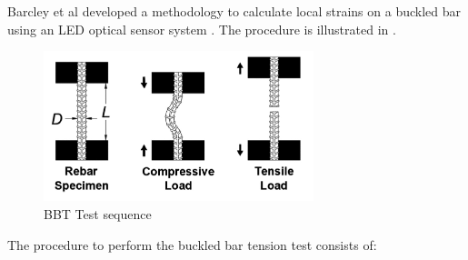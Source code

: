 Barcley et al \cite{Barcley2019} developed a methodology to calculate local strains on a buckled bar using an LED optical sensor system \cite{NorthernDigitalInc.2020}. The procedure is illustrated in .

\begin{figure}[htbp]
	\centering
	\includegraphics[width=0.7\textwidth]{Chapter-3/figs/BBT_Sequence}
	\caption{BBT Test sequence\cite{Barcley2019}}
	\label{fig:BBTseq}
\end{figure}

The procedure to perform the buckled bar tension test consists of:

